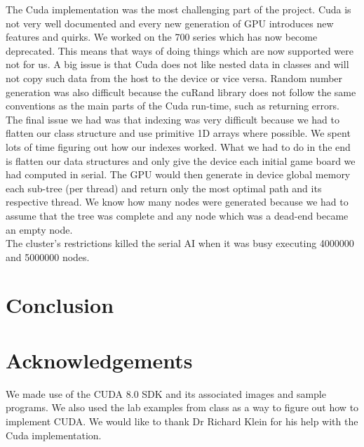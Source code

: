 \documentclass[a4paper]{article}
\begin{document}
\noindent The Cuda implementation was the most challenging part of the project. Cuda is not very well documented and every new generation of GPU introduces new features and quirks. We worked on the 700 series which has now become deprecated. This means that ways of doing things which are now supported were not for us. A big issue is that Cuda does not like nested data in classes and will not copy such data from the host to the device or vice versa. Random number generation was also difficult because the cuRand library does not follow the same conventions as the main parts of the Cuda run-time, such as returning errors. The final issue we had was that indexing was very difficult because we had to flatten our class structure and use primitive 1D arrays where possible. We spent lots of time figuring out how our indexes worked. What we had to do in the end is flatten our data structures and only give the device each initial game board we had computed in serial. The GPU would then generate in device global memory each sub-tree (per thread) and return only the most optimal path and its respective thread. We know how many nodes were generated because we had to assume that the tree was complete and any node which was a dead-end became an empty node.\\

\noindent The cluster’s restrictions killed the serial AI when it was busy executing 4000000 and 5000000 nodes.


\section{Conclusion}

\section*{Acknowledgements}
We made use of the CUDA 8.0 SDK and its associated images and sample programs. We also used the lab examples from class as a way to figure out how to implement CUDA. We would like to thank Dr Richard Klein for his help with the Cuda implementation.


{}
\end{document}
